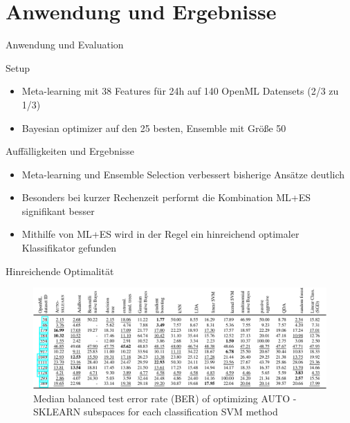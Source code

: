 \documentclass{beamer}
\begin{document}
	
	\section{Anwendung und Ergebnisse}%
	
	\begin{frame}{Anwendung und Evaluation}
		\begin{alertblock}{Setup}
			\begin{itemize}
				\item Meta-learning mit 38 Features für 24h auf 140 OpenML Datensets (2/3 zu 1/3)
				\item Bayesian optimizer auf den 25 besten, Ensemble mit Größe 50
			\end{itemize}
		\end{alertblock}
		\pause
		\begin{alertblock}{Auffälligkeiten und Ergebnisse}
			\begin{itemize}
				\item Meta-learning und Ensemble Selection verbessert bisherige Ansätze deutlich
				\item Besonders bei kurzer Rechenzeit performt die Kombination ML+ES signifikant besser
				\item Mithilfe von ML+ES wird in der Regel ein hinreichend optimaler Klassifikator gefunden
			\end{itemize}
		\end{alertblock}
	\end{frame}
	
	\begin{frame}{Hinreichende Optimalität}
		\begin{figure}[ht]
			\centering
			\includegraphics[width=\linewidth]{Bilder/HinreichendeOptimalitaet}
			\caption{Median balanced test error rate (BER) of optimizing AUTO - SKLEARN subspaces for each classification SVM method}
		\end{figure}
	\end{frame}
	
\end{document}
